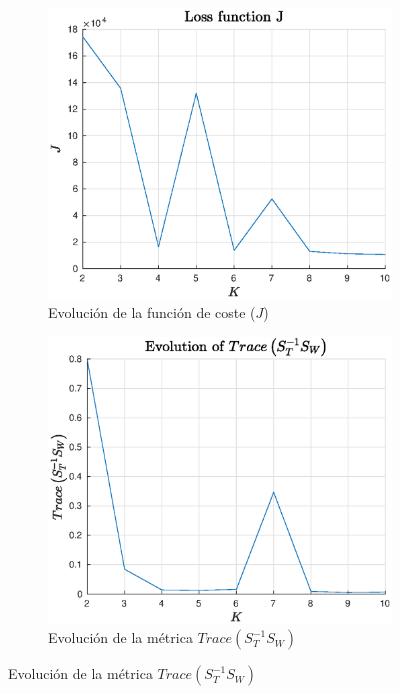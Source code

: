 \documentclass[11pt]{article} %
\begin{document}
\begin{figure}
    \centering
    \begin{subfigure}[b]{0.3\textwidth}
        \includegraphics[width=\textwidth]{../src/fig/21_J_loss.eps}
        \caption[]{Evolución de la función de coste ($J$)}
        \label{fig:21:loss}
    \end{subfigure}
    \quad
    \begin{subfigure}[b]{0.3\textwidth}
        \includegraphics[width=\textwidth]{../src/fig/21_trace1.eps}
        \caption[]{Evolución de la métrica $Trace \left( S_T^{-1} S_W \right)$}

\end{subfigure}
\end{figure}
\end{document}
